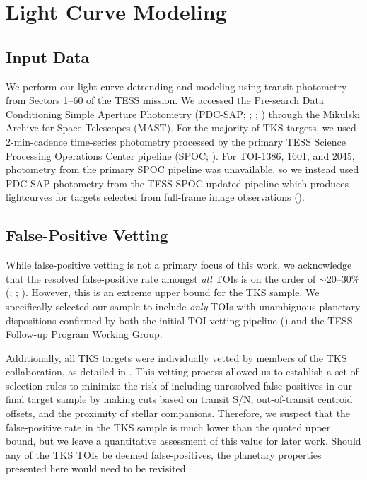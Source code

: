 \documentclass[twocolumn]{aastex63}
\begin{document}
\section{Light Curve Modeling}
\label{sec:lightcurves}

\subsection{Input Data}
\label{sec:photometry}

We perform our light curve detrending and modeling using transit photometry from Sectors 1--60 of the TESS mission. We accessed the Pre-search Data Conditioning Simple Aperture Photometry (PDC-SAP; \citealt{Stumpe12}; \citealt{Stumpe14}; \citealt{Smith12}) through the Mikulski Archive for Space Telescopes (MAST). For the majority of TKS targets, we used 2-min-cadence time-series photometry processed by the primary TESS Science Processing Operations Center pipeline (SPOC; \citealt{Jenkins16}). For TOI-1386, 1601, and 2045, photometry from the primary SPOC pipeline was unavailable, so we instead used PDC-SAP photometry from the TESS-SPOC updated pipeline which produces lightcurves for targets selected from full-frame image observations (\citealt{Caldwell20}).

\subsection{False-Positive Vetting}
\label{sec:fp-vetting}

While false-positive vetting is not a primary focus of this work, we acknowledge that the resolved false-positive rate amongst \textit{all} TOIs is on the order of $\sim$20--30$\%$ (\citealt{toi}; \citealt{Cacciapuoti22}; \citealt{Magliano23}). However, this is an extreme upper bound for the TKS sample. We specifically selected our sample to include \textit{only} TOIs with unambiguous planetary dispositions confirmed by both the initial TOI vetting pipeline (\citealt{Guerrero21}) and the TESS Follow-up Program Working Group.

Additionally, all TKS targets were individually vetted by members of the TKS collaboration, as detailed in \cite{Chontos22}. This vetting process allowed us to establish a set of selection rules to minimize the risk of including unresolved false-positives in our final target sample by making cuts based on transit S/N, out-of-transit centroid offsets, and the proximity of stellar companions. Therefore, we suspect that the false-positive rate in the TKS sample is much lower than the quoted upper bound, but we leave a quantitative assessment of this value for later work. Should any of the TKS TOIs be deemed false-positives, the planetary properties presented here would need to be revisited.
\end{document}
